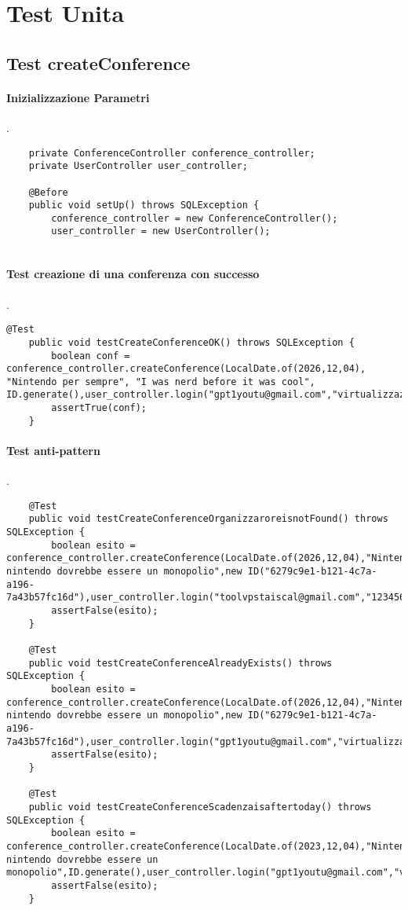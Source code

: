 \section{Test Unita}
\label{sec:test_unita}

\subsection{Test createConference}
\paragraph{Inizializzazione Parametri}
.
\begin{lstlisting}
    private ConferenceController conference_controller;
    private UserController user_controller;

    @Before
    public void setUp() throws SQLException {
        conference_controller = new ConferenceController();
        user_controller = new UserController();
    
\end{lstlisting}
\paragraph{Test creazione di una conferenza con successo}
.
\begin{lstlisting}
@Test
    public void testCreateConferenceOK() throws SQLException {
        boolean conf = conference_controller.createConference(LocalDate.of(2026,12,04), "Nintendo per sempre", "I was nerd before it was cool", ID.generate(),user_controller.login("gpt1youtu@gmail.com","virtualizzazione"));
        assertTrue(conf);
    }
\end{lstlisting}
\paragraph{Test anti-pattern }
.
\begin{lstlisting}
    @Test
    public void testCreateConferenceOrganizzaroreisnotFound() throws SQLException {
        boolean esito = conference_controller.createConference(LocalDate.of(2026,12,04),"Nintendo","Perche nintendo dovrebbe essere un monopolio",new ID("6279c9e1-b121-4c7a-a196-7a43b57fc16d"),user_controller.login("toolvpstaiscal@gmail.com","12345678!"));
        assertFalse(esito);
    }

    @Test
    public void testCreateConferenceAlreadyExists() throws SQLException {
        boolean esito = conference_controller.createConference(LocalDate.of(2026,12,04),"Nintendo","Perche nintendo dovrebbe essere un monopolio",new ID("6279c9e1-b121-4c7a-a196-7a43b57fc16d"),user_controller.login("gpt1youtu@gmail.com","virtualizzazione"));
        assertFalse(esito);
    }

    @Test
    public void testCreateConferenceScadenzaisaftertoday() throws SQLException {
        boolean esito = conference_controller.createConference(LocalDate.of(2023,12,04),"Nintendo","Perche nintendo dovrebbe essere un monopolio",ID.generate(),user_controller.login("gpt1youtu@gmail.com","virtualizzazione"));
        assertFalse(esito);
    }
\end{lstlisting}


